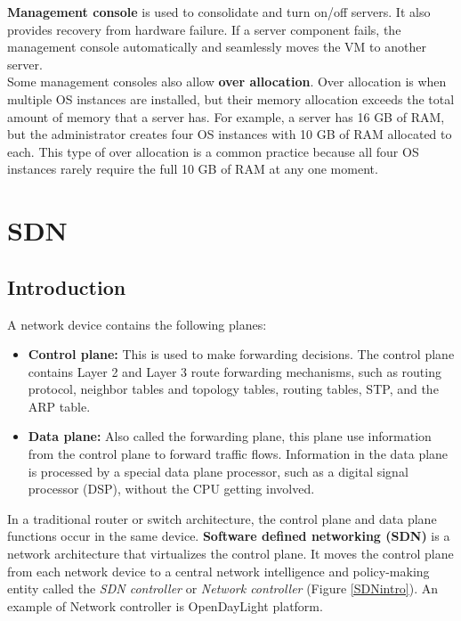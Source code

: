 \textbf{Management console} is used to consolidate and turn on/off servers. It also provides recovery from hardware failure. If a server component fails, the management console automatically and seamlessly moves the VM to another server. \\

Some management consoles also allow \textbf{over allocation}. Over allocation is when multiple OS instances are installed, but their memory allocation exceeds the total amount of memory that a server has. For example, a server has 16 GB of RAM, but the administrator creates four OS instances with 10 GB of RAM allocated to each. This type of over allocation is a common practice because all four OS instances rarely require the full 10 GB of RAM at any one moment.

\section{SDN}

\subsection{Introduction}

A network device contains the following planes:

\begin{itemize}
\item \textbf{Control plane:} This is used to make forwarding decisions. The control plane contains Layer 2 and Layer 3 route forwarding mechanisms, such as routing protocol, neighbor tables and topology tables, routing tables, STP, and the ARP table.

\item \textbf{Data plane:} Also called the forwarding plane, this plane use information from the control plane to forward traffic flows. Information in the data plane is processed by a special data plane processor, such as a digital signal processor (DSP), without the CPU getting involved.
\end{itemize}

In a traditional router or switch architecture, the control plane and data plane functions occur in the same device. \textbf{Software defined networking (SDN)} is a network architecture that  virtualizes the control plane. It moves the control plane from each network device to a central network intelligence and policy-making entity called the \emph{SDN controller} or \emph{Network controller} (Figure \ref{SDNintro}). An example of Network controller is OpenDayLight platform. \\

